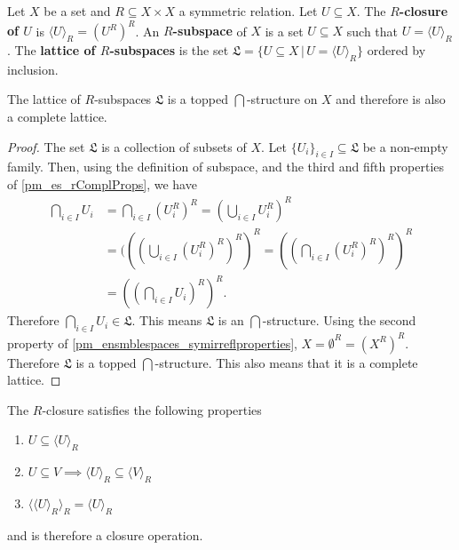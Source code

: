 \begin{mathSection}
	\begin{defn}
		Let $X$ be a set and $R \subseteq X \times X$ a symmetric relation. Let $U \subseteq X$. The \textbf{$R$-closure of $U$} is $\langle U \rangle_R = (U^{R})^{R}$. An \textbf{$R$-subspace} of $X$ is a set $U \subseteq X$ such that $U = \langle U \rangle_R$. The \textbf{lattice of $R$-subspaces} is the set $\mathfrak{L} = \{ U \subseteq X \, | \, U = \langle U \rangle_R \}$ ordered by inclusion.
	\end{defn}
	
	\begin{coro}
		The lattice of $R$-subspaces $\mathfrak{L}$ is a topped $\bigcap$-structure on $X$ and therefore is also a complete lattice.
	\end{coro}
	\begin{proof}
		The set $\mathfrak{L}$ is a collection of subsets of $X$. Let $\{U_i\}_{i \in I} \subseteq \mathfrak{L}$ be a non-empty family. Then, using the definition of subspace, and the third and fifth properties of \ref{pm_es_rComplProps}, we have
		\begin{align*}
			\bigcap_{i \in I} U_i &= \bigcap_{i \in I} (U_i^{R})^{R} = (\bigcup_{i \in I} U_i^{R})^{R} \\
			&= (((\bigcup_{i \in I} (U_i^{R})^{R})^{R})^{R} = ((\bigcap_{i \in I} (U_i^{R})^{R})^{R})^{R} \\
			&= ((\bigcap_{i \in I} U_i)^{R})^{R}.
		\end{align*}
		Therefore $\bigcap_{i \in I} U_i \in \mathfrak{L}$. This means $\mathfrak{L}$ is an $\bigcap$-structure. Using the second property of \ref{pm_ensmblespaces_symirreflproperties}, $X = \emptyset^{R} = (X^{R})^{R}$. Therefore $\mathfrak{L}$ is a topped $\bigcap$-structure. This also means that it is a complete lattice.
	\end{proof}
	
	\begin{coro}\label{pm_es_subspaceClosure}
		The $R$-closure satisfies the following properties
		\begin{enumerate}
			\item $U \subseteq \langle U \rangle_R$
			\item $U \subseteq V \implies \langle U \rangle_R \subseteq \langle V \rangle_R$
			\item $\langle \langle U \rangle_R \rangle_R = \langle U \rangle_R $
		\end{enumerate}
		and is therefore a closure operation.
	\end{coro}
	

\end{mathSection}
